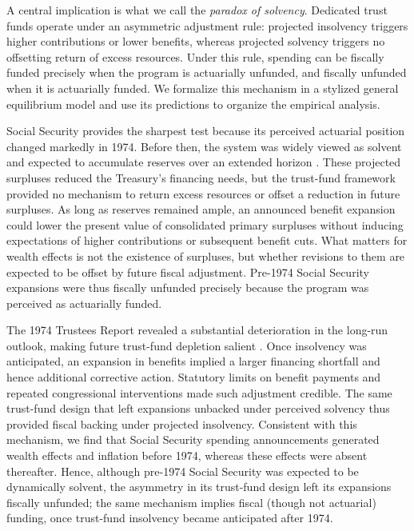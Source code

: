 \documentclass[12pt]{article}%
\theoremstyle{remark}
\begin{document}
A central implication is what we call the \textit{paradox of solvency}. Dedicated trust funds operate under an asymmetric adjustment rule: projected insolvency triggers higher contributions or lower benefits, whereas projected solvency triggers no offsetting return of excess resources. Under this rule, spending can be fiscally funded precisely when the program is actuarially unfunded, and fiscally unfunded when it is actuarially funded. We formalize this mechanism in a stylized general equilibrium model and use its predictions to organize the empirical analysis.

Social Security provides the sharpest test because its perceived actuarial position changed markedly in 1974. Before then, the system was widely viewed as solvent and expected to accumulate reserves over an extended horizon \citep{SSA1973Trustees,GAO1974SSFinancing}. These projected surpluses reduced the Treasury's financing needs, but the trust-fund framework provided no mechanism to return excess resources or offset a reduction in future surpluses. As long as reserves remained ample, an announced benefit expansion could lower the present value of consolidated primary surpluses without inducing expectations of higher contributions or subsequent benefit cuts. What matters for wealth effects is not the existence of surpluses, but whether revisions to them are expected to be offset by future fiscal adjustment. Pre-1974 Social Security expansions were thus fiscally unfunded precisely because the program was perceived as actuarially funded.

The 1974 Trustees Report revealed a substantial deterioration in the long-run outlook, making future trust-fund depletion salient \citep{SSA1974Trustees}. Once insolvency was anticipated, an expansion in benefits implied a larger financing shortfall and hence additional corrective action. Statutory limits on benefit payments and repeated congressional interventions made such adjustment credible. The same trust-fund design that left expansions unbacked under perceived solvency thus provided fiscal backing under projected insolvency. Consistent with this mechanism, we find that Social Security spending announcements generated wealth effects and inflation before 1974, whereas these effects were absent thereafter. Hence, although pre-1974 Social Security was expected to be dynamically solvent, the asymmetry in its trust-fund design left its expansions fiscally unfunded; the same mechanism implies fiscal (though not actuarial) funding, once trust-fund insolvency became anticipated after 1974.
\end{document}
